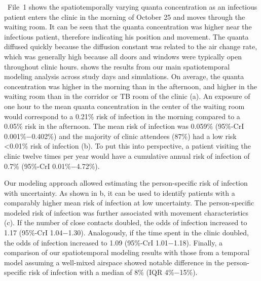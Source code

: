 \documentclass[fleqn,11pt]{wlscirep}
\begin{document}
\supp~File~1 shows the spatiotemporally varying quanta concentration as an infectious patient enters the clinic in the morning of October 25 and moves through the waiting room. It can be seen that the quanta concentration was higher near the infectious patient, therefore indicating his position and movement. The quanta diffused quickly because the diffusion constant was related to the air change rate, which was generally high because all doors and windows were typically open throughout clinic hours.  shows the results from our main spatiotemporal modeling analysis across study days and simulations. On average, the quanta concentration was higher in the morning than in the afternoon, and higher in the waiting room than in the corridor or TB room of the clinic (a). An exposure of one hour to the mean quanta concentration in the center of the waiting room would correspond to a 0.21\% risk of infection in the morning compared to a 0.05\% risk in the afternoon. The mean risk of infection was 0.059\% (95\%-CrI 0.001\%$-$0.402\%) and the majority of clinic attendees (87\%) had a low risk <0.01\% risk of infection (b). To put this into perspective, a patient visiting the clinic twelve times per year would have a cumulative annual risk of infection of 0.7\% (95\%-CrI 0.01\%$-$4.72\%). 

Our modeling approach allowed estimating the person-specific risk of infection with uncertainty. As shown in b, it can be used to identify patients with a comparably higher mean risk of infection at low uncertainty. The person-specific modeled risk of infection was further associated with movement characteristics (c). If the number of close contacts doubled, the odds of infection increased to 1.17 (95\%-CrI 1.04$-$1.30). Analogously, if the time spent in the clinic doubled, the odds of infection increased to 1.09 (95\%-CrI 1.01$-$1.18). Finally, a comparison of our spatiotemporal modeling results with those from a temporal model assuming a well-mixed airspace showed notable difference in the person-specific risk of infection with a median of 8\% (IQR 4\%$-$15\%).  
\end{document}
